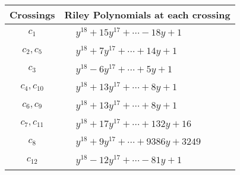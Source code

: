 \documentclass[1p]{elsarticle_modified}
\theoremstyle{definition}
\begin{document}
\begin{tabular}{m{50pt}|m{274pt}}
Crossings & \hspace{64pt}Riley Polynomials at each crossing \\
\hline $$\begin{aligned}c_{1}\end{aligned}$$&$\begin{aligned}
&y^{18}+15 y^{17}+\cdots-18 y+1
\end{aligned}$\\
\hline $$\begin{aligned}c_{2},c_{5}\end{aligned}$$&$\begin{aligned}
&y^{18}+7 y^{17}+\cdots+14 y+1
\end{aligned}$\\
\hline $$\begin{aligned}c_{3}\end{aligned}$$&$\begin{aligned}
&y^{18}-6 y^{17}+\cdots+5 y+1
\end{aligned}$\\
\hline $$\begin{aligned}c_{4},c_{10}\end{aligned}$$&$\begin{aligned}
&y^{18}+13 y^{17}+\cdots+8 y+1
\end{aligned}$\\
\hline $$\begin{aligned}c_{6},c_{9}\end{aligned}$$&$\begin{aligned}
&y^{18}+13 y^{17}+\cdots+8 y+1
\end{aligned}$\\
\hline $$\begin{aligned}c_{7},c_{11}\end{aligned}$$&$\begin{aligned}
&y^{18}+17 y^{17}+\cdots+132 y+16
\end{aligned}$\\
\hline $$\begin{aligned}c_{8}\end{aligned}$$&$\begin{aligned}
&y^{18}+9 y^{17}+\cdots+9386 y+3249
\end{aligned}$\\
\hline $$\begin{aligned}c_{12}\end{aligned}$$&$\begin{aligned}
&y^{18}-12 y^{17}+\cdots-81 y+1
\end{aligned}$\\
\hline
\end{tabular}\\~\\
\end{document}
